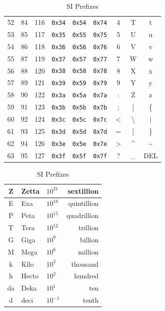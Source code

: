 \documentclass[12pt]{article}
\begin{document}
\begin{table}[H]
\begin{minipage}{.55\linewidth}
\begin{tabular}{rrr | rrr | ccc}
	52 & 84 & 116	& \texttt{0x34} & \texttt{0x54} & \texttt{0x74}	& 4		& T 	& t\\
	53 & 85 & 117	& \texttt{0x35} & \texttt{0x55} & \texttt{0x75}	& 5		& U 	& u\\
	54 & 86 & 118	& \texttt{0x36} & \texttt{0x56} & \texttt{0x76} 	& 6		& V 	& v\\
	55 & 87 & 119	& \texttt{0x37} & \texttt{0x57} & \texttt{0x77}	& 7		& W 	& w\\
	56 & 88 & 120	& \texttt{0x38} & \texttt{0x58} & \texttt{0x78}	& 8		& X 	& x\\
	57 & 89 & 121 	& \texttt{0x39} & \texttt{0x59} & \texttt{0x79}	& 9		& Y 	& y\\
	58 & 90 & 122	& \texttt{0x3a} & \texttt{0x5a} & \texttt{0x7a}	& :		& Z	& z\\
	59 & 91 & 123	& \texttt{0x3b} & \texttt{0x5b} & \texttt{0x7b}	& ;		& [	& \{\\
	60 & 92 & 124	& \texttt{0x3c} & \texttt{0x5c} & \texttt{0x7c}	& $<$	& \textbackslash	& $\vert$\\
	61 & 93 & 125	& \texttt{0x3d} & \texttt{0x5d} & \texttt{0x7d}	& =		& ]	& \}\\
	62 & 94 & 126	& \texttt{0x3e} & \texttt{0x5e} & \texttt{0x7e}	& $>$	& \^{}	& \~{}\\
	63 & 95 & 127	& \texttt{0x3f} & \texttt{0x5f} & \texttt{0x7f}	& ?		& \_	& DEL\\
	\end{tabular}\end{minipage}\hfill
	\begin{minipage}{.45\linewidth}
	\centering
	\caption{SI Prefixes \label{tab:SI PREFIXES}}
	\begin{tabular}{cllr}
	\hline
	Z 	& Zetta	& $10^{21}$	& sextillion\\\hline
	E 	& Exa		& $10^{18}$	& quintillion\\\hline
	P 	& Peta	& $10^{15}$	& quadrillion\\\hline
	T	& Tera	& $10^{12}$	& trillion\\\hline
	G	& Giga	& $10^{9}$		& billion\\\hline
	M	& Mega	& $10^{6}$		& million\\\hline
	k	& Kilo	& $10^{3}$		& thousand\\\hline
	h 	& Hecto	& $10^{2}$		& hundred\\\hline
	da	& Deka	& $10^{1}$		& ten\\\hline
	d 	& deci	& $10^{-1}$	& tenth\\\hline

\end{tabular}
\end{minipage}
\end{table}
\end{document}
